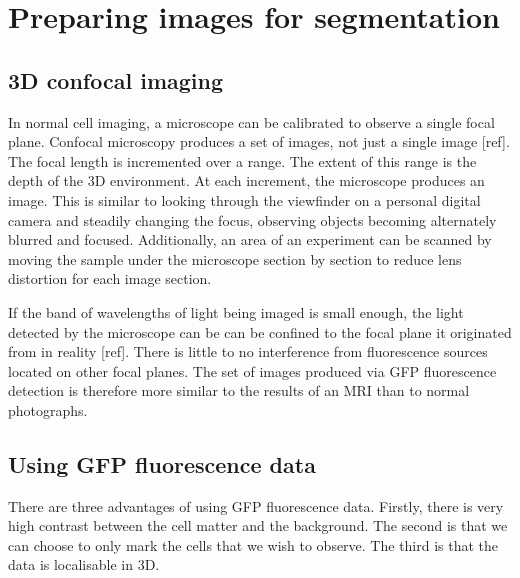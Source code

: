 
\chapter{Preparing images for segmentation}

\ifpdf
    \graphicspath{{Chapter3/Figs/Raster/}{Chapter3/Figs/PDF/}{Chapter3/Figs/}}
\else
    \graphicspath{{Chapter3/Figs/Vector/}{Chapter3/Figs/}}
\fi

\section{3D confocal imaging}

In normal cell imaging, a microscope can be calibrated to observe a single focal plane. Confocal microscopy produces a set of images, not just a single image [ref]. The focal length is incremented over a range. The extent of this range is the depth of the 3D environment. At each increment, the microscope produces an image. This is similar to looking through the viewfinder on a personal digital camera and steadily changing the focus, observing objects becoming alternately blurred and focused. Additionally, an area of an experiment can be scanned by moving the sample under the microscope section by section to reduce lens distortion for each image section.

If the band of wavelengths of light being imaged is small enough, the light detected by the microscope can be can be confined to the focal plane it originated from in reality [ref]. There is little to no interference from fluorescence sources located on other focal planes. The set of images produced via GFP fluorescence detection is therefore more similar to the results of an MRI than to normal photographs.

\section{Using GFP fluorescence data}

There are three advantages of using GFP fluorescence data. Firstly, there is very high contrast between the cell matter and the background. The second is that we can choose to only mark the cells that we wish to observe. The third is that the data is localisable in 3D.

